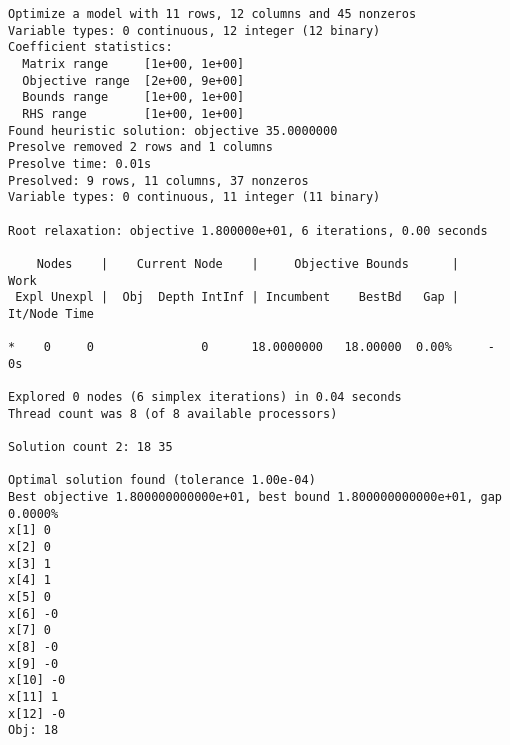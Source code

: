 \begin{verbatim}
Optimize a model with 11 rows, 12 columns and 45 nonzeros
Variable types: 0 continuous, 12 integer (12 binary)
Coefficient statistics:
  Matrix range     [1e+00, 1e+00]
  Objective range  [2e+00, 9e+00]
  Bounds range     [1e+00, 1e+00]
  RHS range        [1e+00, 1e+00]
Found heuristic solution: objective 35.0000000
Presolve removed 2 rows and 1 columns
Presolve time: 0.01s
Presolved: 9 rows, 11 columns, 37 nonzeros
Variable types: 0 continuous, 11 integer (11 binary)

Root relaxation: objective 1.800000e+01, 6 iterations, 0.00 seconds

    Nodes    |    Current Node    |     Objective Bounds      |     Work
 Expl Unexpl |  Obj  Depth IntInf | Incumbent    BestBd   Gap | It/Node Time

*    0     0               0      18.0000000   18.00000  0.00%     -    0s

Explored 0 nodes (6 simplex iterations) in 0.04 seconds
Thread count was 8 (of 8 available processors)

Solution count 2: 18 35 

Optimal solution found (tolerance 1.00e-04)
Best objective 1.800000000000e+01, best bound 1.800000000000e+01, gap 0.0000%
x[1] 0
x[2] 0
x[3] 1
x[4] 1
x[5] 0
x[6] -0
x[7] 0
x[8] -0
x[9] -0
x[10] -0
x[11] 1
x[12] -0
Obj: 18
\end{verbatim}


